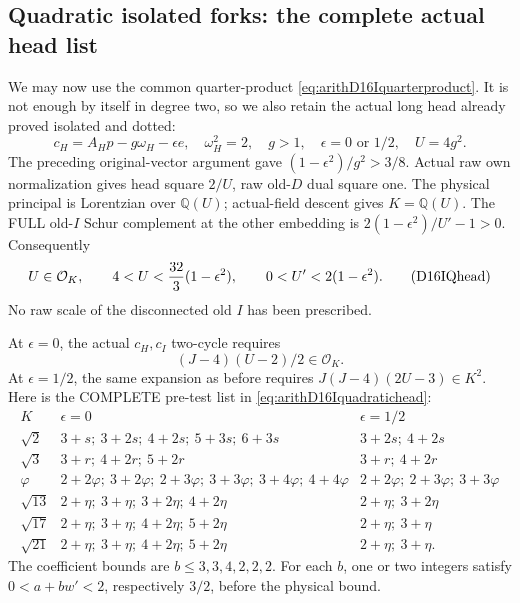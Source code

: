 \documentclass[11pt]{article}
\begin{document}
\subsection{Quadratic isolated forks: the complete actual head list}
\label{app:arithD16Iquadratichead}

We may now use the common
quarter-product
\eqref{eq:arithD16Iquarterproduct}.
It is not enough by itself in
degree two, so we also retain
the actual long head already proved
isolated and dotted:
\[
 c_H=A_Hp-g\omega_H-\epsilon e,\quad
 \omega_H^2=2,\quad g>1,\quad
 \epsilon=0\text{ or }1/2,\quad U=4g^2 .
\]
The preceding original-vector
argument gave
\((1-\epsilon^2)/g^2>3/8\).
Actual raw own normalization gives
head square \(2/U\), raw old-\(D\)
dual square one.
The physical principal is Lorentzian
over \(\mathbb Q(U)\); actual-field
descent gives \(K=\mathbb Q(U)\).
The FULL old-\(I\) Schur complement
at the other embedding is
\(2(1-\epsilon^2)/U'-1>0\).
Consequently
\[
 U\in\mathcal O_K,\qquad
       4<U<{32\over3}(1-\epsilon^2),\qquad
       0<U'<2(1-\epsilon^2).
\tag{D16IQhead}\label{eq:arithD16Iquadratichead}
\]
No raw scale of the disconnected
old \(I\) has been prescribed.

At \(\epsilon=0\), the actual
\(c_H,c_I\) two-cycle requires
\[
                              (J-4)(U-2)/2\in\mathcal O_K .
\]
At \(\epsilon=1/2\), the same expansion
as before requires
\(J(J-4)(2U-3)\in K^2\).
Here is the COMPLETE pre-test list
in \eqref{eq:arithD16Iquadratichead}:
\[
\begin{array}{c|l|l}
 K&\epsilon=0&\epsilon=1/2\\ \hline
 \sqrt2&3+s;\ 3+2s;\ 4+2s;\ 5+3s;\ 6+3s&3+2s;\ 4+2s\\
 \sqrt3&3+r;\ 4+2r;\ 5+2r&3+r;\ 4+2r\\
 \varphi&2+2\varphi;\ 3+2\varphi;\ 2+3\varphi;\
       3+3\varphi;\ 3+4\varphi;\ 4+4\varphi&
       2+2\varphi;\ 2+3\varphi;\ 3+3\varphi\\
 \sqrt{13}&2+\eta;\ 3+\eta;\ 3+2\eta;\ 4+2\eta&2+\eta;\ 3+2\eta\\
 \sqrt{17}&2+\eta;\ 3+\eta;\ 4+2\eta;\ 5+2\eta&2+\eta;\ 3+\eta\\
 \sqrt{21}&2+\eta;\ 3+\eta;\ 4+2\eta;\ 5+2\eta&2+\eta;\ 3+\eta .
\end{array}
\]
The coefficient bounds are
\(b\le3,3,4,2,2,2\).
For each \(b\), one or two integers
satisfy \(0<a+bw'<2\), respectively
\(3/2\), before the physical bound.
\end{document}
